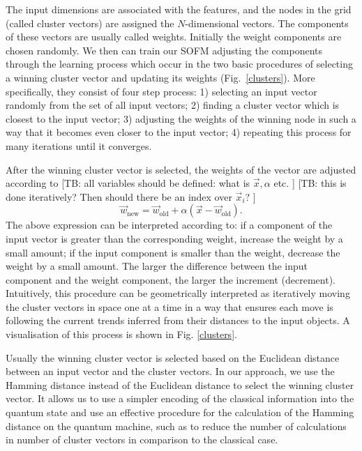 \documentclass[pra,showkeys,twocolumn,showpacs]{revtex4-1}
\begin{document}
The input dimensions are associated with the features, and the nodes in the grid (called cluster vectors) are assigned the $N$-dimensional vectors. The components of these vectors are usually called weights. Initially the weight components are chosen randomly. We then can train our SOFM adjusting the components through the learning process which occur in the two basic procedures of selecting a winning cluster vector and updating its weights (Fig.~\ref{clusters}). More specifically, they consist of four step process: 1) selecting an input vector randomly from the set of all input vectors; 2) finding a cluster vector which is closest to the input vector; 3) adjusting the weights of the winning node in such a way that it becomes even closer to the input vector; 4) repeating this process for many iterations until it converges.


After the winning cluster vector is selected, the weights of the vector are adjusted according to [TB: all variables should be defined: what is $ \vec{x} , \alpha $ etc. ] [TB: this is done iteratively? Then should there be an index over  $ \vec{x}_i $? ]
%
\begin{equation}
    \vec w_{\mathrm{new}} =
        \vec w_{\mathrm{old}} 
        + \alpha\left(\vec{x} - \vec w_{\mathrm{old}}\right)  .
    \label{eq:learning}
\end{equation}
%
The above expression can be interpreted according to: if a component of the input vector is greater than the corresponding weight, increase the weight by a small amount; if the input component is smaller than the weight, decrease the
weight by a small amount. The larger the difference between the input component and the weight component, the larger the increment (decrement). Intuitively, this procedure can be geometrically interpreted as iteratively moving the cluster vectors in space one at a time in a way that ensures each move is following the current trends inferred from their distances to the input objects. A visualisation of this process is shown in Fig. \ref{clusters}.

Usually the winning cluster vector is selected based on the Euclidean distance between an input vector and the cluster vectors. In our approach, we use the Hamming distance instead of the Euclidean distance to select the winning cluster vector. It allows us to use a simpler encoding of the classical information into the quantum state and use an effective procedure for the calculation of the Hamming distance on the quantum machine, such as to reduce the number of calculations in number of cluster vectors in comparison to the classical case.
\end{document}
